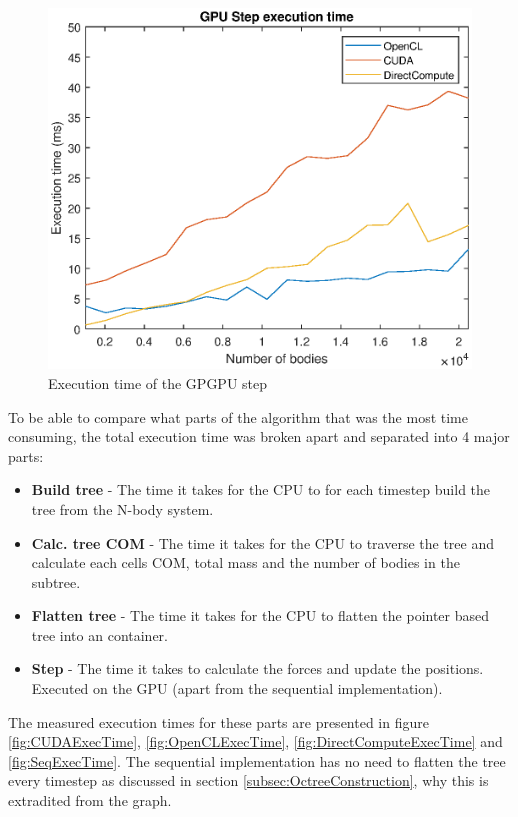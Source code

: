 \begin{figure}[H]
    \centering
    \includegraphics[width=\textwidth]{Results/Figs/GPUStepExecutionTime.eps}
    \caption{Execution time of the GPGPU step}
    \label{fig:GPUStepExecTime}
\end{figure}

To be able to compare what parts of the algorithm that was the most time consuming, the total execution time was broken apart and separated into 4 major parts:
\begin{itemize}
    \item \textbf{Build tree} - The time it takes for the CPU to for each timestep build the tree from the N-body system.
    \item \textbf{Calc. tree COM} - The time it takes for the CPU to traverse the tree and calculate each cells COM, total mass and the number of bodies in the subtree.
    \item \textbf{Flatten tree} - The time it takes for the CPU to flatten the pointer based tree into an container.
    \item \textbf{Step} - The time it takes to calculate the forces and update the positions. Executed on the GPU (apart from the sequential implementation).
\end{itemize}

The measured execution times for these parts are presented in figure \ref{fig:CUDAExecTime}, \ref{fig:OpenCLExecTime}, \ref{fig:DirectComputeExecTime} and \ref{fig:SeqExecTime}. The sequential implementation has no need to flatten the tree every timestep as discussed in section \ref{subsec:OctreeConstruction}, why this is extradited from the graph. 


